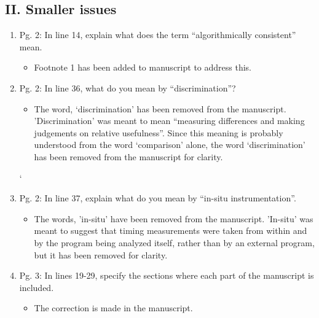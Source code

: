 \documentclass{article}
\begin{document}
  \subsection*{II. Smaller issues}
  \begin{enumerate}

  \item
	Pg. 2: In line 14, explain what does the term ``algorithmically consistent'' mean.

{\color{red}
  \begin{itemize}
      \item Footnote 1 has been added to manuscript to address this.
  \end{itemize}}

  \item
	Pg. 2: In line 36, what do you mean by “discrimination”?

{\color{red}  
\begin{itemize}
     \item

      The word, `discrimination' has been removed from the manuscript.
      'Discrimination' was meant to mean ``measuring differences and making
      judgements on relative usefulness''. Since this meaning is probably
      understood from the word `comparison' alone, the word `discrimination'
      has been removed from the manuscript for clarity.
      
  \end{itemize}}
	
` \item	
	Pg. 2: In line 37, explain what do you mean by ``in-situ instrumentation''.

{\color{red}  
\begin{itemize}
     \item
         
      The words, 'in-situ' have been removed from the manuscript. 'In-situ' was
      meant to suggest that timing measurements were taken from within and by
      the program being analyzed itself, rather than by an external program,
      but it has been removed for clarity.

  \end{itemize}}
	
  \item 
	Pg. 3: In lines 19-29, specify the sections where each part of the manuscript is
included.

{\color{red}  
\begin{itemize}
     \item
      The correction is made in the manuscript.
  \end{itemize}}


\end{enumerate}
\end{document}
